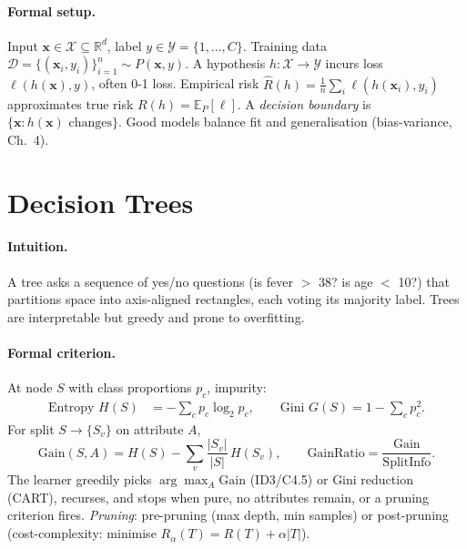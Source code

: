 \paragraph{Formal setup.} Input $\mathbf{x}\in\mathcal{X}\subseteq\mathbb{R}^d$, label $y\in\mathcal{Y}=\{1,\dots,C\}$. Training data $\mathcal{D}=\{(\mathbf{x}_i,y_i)\}_{i=1}^n\sim P(\mathbf{x},y)$. A hypothesis $h:\mathcal{X}\to\mathcal{Y}$ incurs loss $\ell(h(\mathbf{x}),y)$, often 0-1 loss. Empirical risk $\hat{R}(h)=\frac1n\sum_i\ell(h(\mathbf{x}_i),y_i)$ approximates true risk $R(h)=\mathbb{E}_{P}[\ell]$. A \emph{decision boundary} is $\{\mathbf{x}: h(\mathbf{x})\text{ changes}\}$. Good models balance fit and generalisation (bias-variance, Ch.~4).

\section{Decision Trees}
\label{sec:trees}
\paragraph{Intuition.} A tree asks a sequence of yes/no questions (is fever $>$ 38? is age $<$ 10?) that partitions space into axis-aligned rectangles, each voting its majority label. Trees are interpretable but greedy and prone to overfitting.

\paragraph{Formal criterion.} At node $S$ with class proportions $p_c$, impurity:
\begin{align}
\text{Entropy } H(S) &= -\sum_{c} p_c\log_2 p_c, \qquad
\text{Gini } G(S)=1-\sum_c p_c^2.
\end{align}
For split $S\to\{S_v\}$ on attribute $A$,
\begin{equation}
\text{Gain}(S,A)= H(S)-\sum_v \frac{|S_v|}{|S|}\,H(S_v),\qquad
\text{GainRatio}= \frac{\text{Gain}}{\text{SplitInfo}}.
\end{equation}
The learner greedily picks $\arg\max_A \text{Gain}$ (ID3/C4.5) or Gini reduction (CART), recurses, and stops when pure, no attributes remain, or a pruning criterion fires. \emph{Pruning}: pre-pruning (max depth, min samples) or post-pruning (cost-complexity: minimise $R_\alpha(T)=R(T)+\alpha|T|$).

